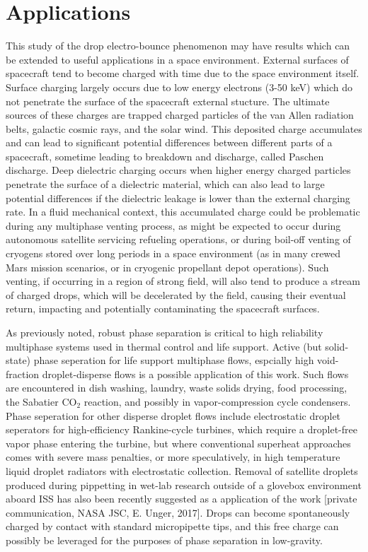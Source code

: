 \documentclass[12pt,a4paper,oneside]{book}
\begin{document}
\section{Applications}
This study of the drop electro-bounce phenomenon may have results which can be extended to useful applications in a space environment. External surfaces of spacecraft tend to become charged with time due to the space environment itself. Surface charging largely occurs due to low energy electrons (3-50 keV) which do not penetrate the surface of the spacecraft external stucture\cite{czepiela_charging_1997}. The ultimate sources of these charges are trapped charged particles of the van Allen radiation belts, galactic cosmic rays, and the solar wind. This deposited charge accumulates and can lead to significant potential differences between different parts of a spacecraft, sometime leading to breakdown and discharge, called Paschen discharge. Deep dielectric charging occurs when higher energy charged particles penetrate the surface of a dielectric material, which can also lead to large potential differences if the dielectric leakage is lower than the external charging rate. In a fluid mechanical context, this accumulated charge could be problematic during any multiphase venting process, as might be expected to occur during autonomous satellite servicing refueling operations, or during boil-off venting of cryogens stored over long periods in a space environment (as in many crewed Mars mission scenarios, or in cryogenic propellant depot operations). Such venting, if occurring in a region of strong field, will also tend to produce a stream of charged drops, which will be decelerated by the field, causing their eventual return, impacting and potentially contaminating the spacecraft surfaces.

As previously noted, robust phase separation is critical to high reliability multiphase systems used in thermal control and life support. Active (but solid-state) phase seperation for life support multiphase flows, espcially high void-fraction droplet-disperse flows is a possible application of this work. Such flows are encountered in dish washing, laundry, waste solids drying, food processing, the Sabatier CO$_2$ reaction, and possibly in vapor-compression cycle condensers. Phase seperation for other disperse droplet flows include electrostatic droplet seperators for high-efficiency Rankine-cycle turbines, which require a droplet-free vapor phase entering the turbine, but where conventional superheat approaches comes with severe mass penalties\cite{unterberg_zero_1962}, or more speculatively, in high temperature liquid droplet radiators with electrostatic collection\cite{white_liquid_1987}. Removal of satellite droplets produced during pippetting in wet-lab research outside of a glovebox environment aboard ISS has also been recently suggested as a application of the work [private communication, NASA JSC, E. Unger, 2017]. Drops can become spontaneously charged by contact with standard micropipette tips\cite{choi_spontaneous_2013}, and this free charge can possibly be leveraged for the purposes of phase separation in low-gravity. 
\end{document}
